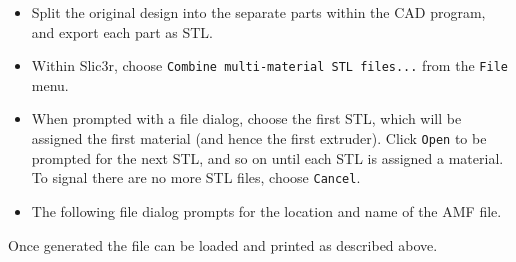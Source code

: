 \begin{itemize}
    \item Split the original design into the separate parts within the CAD program, and export each part as STL.
    \item Within Slic3r, choose \texttt{Combine multi-material STL files...} from the \texttt{File} menu.
    \item When prompted with a file dialog, choose the first STL, which will be assigned the first material (and hence the first extruder). Click \texttt{Open} to be prompted for the next STL, and so on until each STL is assigned a material.  To signal there are no more STL files, choose \texttt{Cancel}.
    \item The following file dialog prompts for the location and name of the AMF file.
\end{itemize}

Once generated the file can be loaded and printed as described above.


